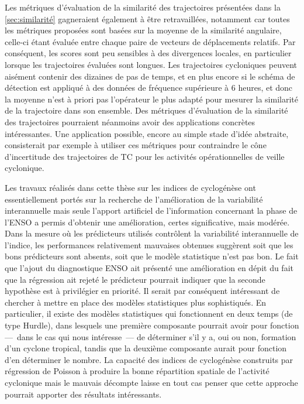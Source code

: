 \documentclass[../main.tex]{subfiles}
\begin{document}
Les métriques d'évaluation de la similarité des trajectoires présentées dans la \cref{sec:similarité} gagneraient également à être retravaillées, notamment car
toutes les métriques proposées sont basées sur la moyenne de la similarité angulaire, celle-ci étant évaluée entre chaque paire de vecteurs de déplacements
relatifs. Par conséquent, les scores sont peu sensibles à des divergences locales, en particulier lorsque les trajectoires évaluées sont longues. Les
trajectoires cycloniques peuvent aisément contenir des dizaines de pas de temps, et en plus encore si le schéma de détection est appliqué à des données de
fréquence supérieure à \num{6} heures, et donc la moyenne n'est à priori pas l'opérateur le plus adapté pour mesurer la similarité de la trajectoire dans son
ensemble. Des métriques d'évaluation de la similarité des trajectoires pourraient néanmoins avoir des applications concrètes intéressantes. Une application
possible, encore au simple stade d'idée abstraite, consisterait par exemple à utiliser ces métriques pour contraindre le cône d'incertitude des trajectoires de
TC pour les activités opérationnelles de veille cyclonique.

Les travaux réalisés dans cette thèse sur les indices de cyclogénèse ont essentiellement portés sur la recherche de l'amélioration de la variabilité
interannuelle mais seule l'apport artificiel de l'information concernant la phase de l'ENSO a permis d'obtenir une amélioration, certes significative, mais
modérée. Dans la mesure où les prédicteurs utilisés contrôlent la variabilité interannuelle de l'indice, les performances relativement mauvaises obtenues
suggèrent soit que les bons prédicteurs sont absents, soit que le modèle statistique n'est pas bon. Le fait que l'ajout du diagnostique ENSO ait présenté une
amélioration en dépit du fait que la régression ait rejeté le prédicteur pourrait indiquer que la seconde hypothèse est à privilégier en priorité. Il serait par
conséquent intéressant de chercher à mettre en place des modèles statistiques plus sophistiqués. En particulier, il existe des modèles statistiques qui
fonctionnent en deux temps (de type Hurdle), dans lesquels une première composante pourrait avoir pour fonction ---~dans le cas qui nous intéresse~--- de
déterminer s'il y a, oui ou non, formation d'un cyclone tropical, tandis que la deuxième composante aurait pour fonction d'en déterminer le nombre. La capacité
des indices de cyclogénèse construits par régression de Poisson à produire la bonne répartition spatiale de l'activité cyclonique mais le mauvais décompte
laisse en tout cas penser que cette approche pourrait apporter des résultats intéressants.
\end{document}
